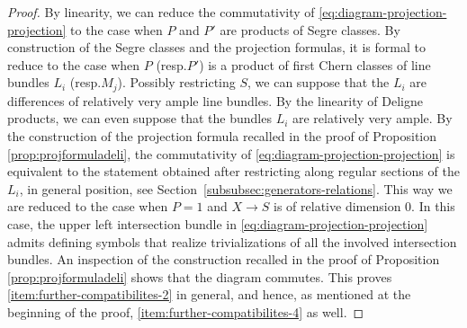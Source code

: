 \documentclass[11pt]{article}
\newcommand{\resp}{resp.\xspace}
\theoremstyle{plain}
\theoremstyle{definition}
\begin{document}
\begin{proof}
By linearity, we can reduce the commutativity of \eqref{eq:diagram-projection-projection} to the case when $P$ and $P'$ are products of Segre classes. By construction of the Segre classes and the projection formulas, it is formal to reduce to the case when $P$ (\resp $P'$) is a product of first Chern classes of line bundles $L_i$ (\resp $M_j$). Possibly restricting $S$, we can suppose that the $L_{i}$ are differences of relatively very ample line bundles. By the linearity of Deligne products, we can even suppose that the bundles $L_i$ are relatively very ample. By the construction of the projection formula recalled in the proof of Proposition \ref{prop:projformuladeli}, the commutativity of \eqref{eq:diagram-projection-projection} is equivalent to the statement obtained after restricting along regular sections of the $L_i$, in general position, see Section~\ref{subsubsec:generators-relations}. This way we are reduced to the case when $P=1$ and $X \to S$ is of relative dimension 0. In this case, the upper left intersection bundle in \eqref{eq:diagram-projection-projection} admits defining symbols that realize trivializations of all the involved intersection bundles. An inspection of the construction recalled in the proof of Proposition \ref{prop:projformuladeli} shows that the diagram commutes. This proves \eqref{item:further-compatibilites-2} in general, and hence, as mentioned at the beginning of the proof, \eqref{item:further-compatibilites-4} as well.


\end{proof}
\end{document}
